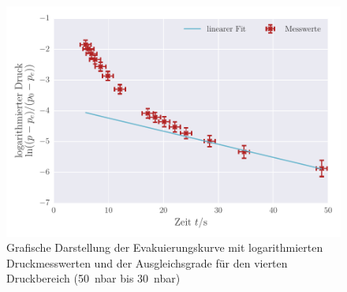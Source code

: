 \begin{figure}[!h]
 \centering
 \includegraphics[scale=0.8]{../Grafiken/Evakuierungskurve_Turbo_log_3.pdf}
 \caption{Grafische Darstellung der Evakuierungskurve mit logarithmierten Druckmesswerten und der Ausgleichsgrade für den vierten Druckbereich (\SI{50}{\nano\bar} bis \SI{30}{\nano\bar})\label{fig:evakuierungskurve_turbo_log_3}}
 \end{figure} 